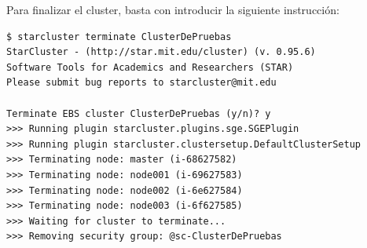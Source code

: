 \documentclass{article}
\begin{document}
	Para finalizar el cluster, basta con introducir la siguiente instrucción:
\begin{lstlisting}[style=miniBash]
$ starcluster terminate ClusterDePruebas
StarCluster - (http://star.mit.edu/cluster) (v. 0.95.6)
Software Tools for Academics and Researchers (STAR)
Please submit bug reports to starcluster@mit.edu

Terminate EBS cluster ClusterDePruebas (y/n)? y
>>> Running plugin starcluster.plugins.sge.SGEPlugin
>>> Running plugin starcluster.clustersetup.DefaultClusterSetup
>>> Terminating node: master (i-68627582)
>>> Terminating node: node001 (i-69627583)
>>> Terminating node: node002 (i-6e627584)
>>> Terminating node: node003 (i-6f627585)
>>> Waiting for cluster to terminate... 
>>> Removing security group: @sc-ClusterDePruebas 
\end{lstlisting}
\end{document}
